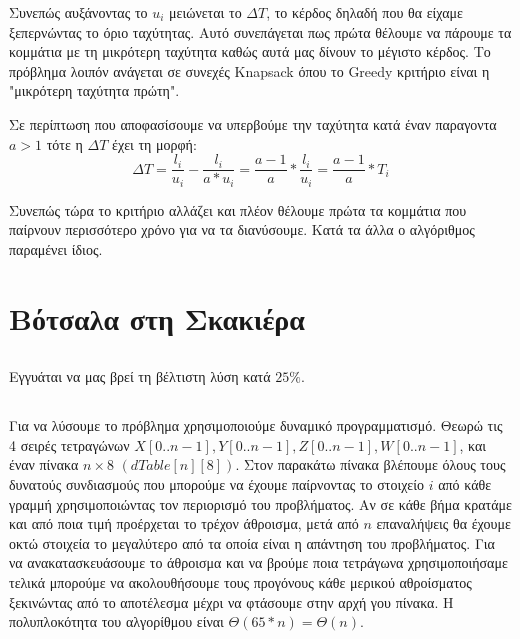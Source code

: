 \documentclass[a4paper,10pt]{article} \usepackage{anysize}
\begin{document}
Συνεπώς αυξάνοντας το $u_i$ μειώνεται το $\Delta{T}$, το κέρδος δηλαδή που θα
είχαμε ξεπερνώντας το όριο ταχύτητας. Αυτό συνεπάγεται πως πρώτα θέλουμε να
πάρουμε τα κομμάτια με τη μικρότερη ταχύτητα καθώς αυτά μας δίνουν το μέγιστο
κέρδος. Το πρόβλημα λοιπόν ανάγεται σε συνεχές Knapsack όπου το Greedy
κριτήριο είναι η "μικρότερη ταχύτητα πρώτη".

Σε περίπτωση που αποφασίσουμε να υπερβούμε την ταχύτητα κατά έναν παραγοντα
$a>1$ τότε η $\Delta{T}$ έχει τη μορφή:
\[
	\Delta{T}=\frac{l_i}{u_i} - \frac{l_i}{a*u_i} =
	\frac{a-1}{a}*\frac{l_i}{u_i} = \frac{a-1}{a}*T_i
\] 

Συνεπώς τώρα το κριτήριο αλλάζει και πλέον θέλουμε πρώτα τα κομμάτια που
παίρνουν περισσότερο χρόνο για να τα διανύσουμε. Κατά τα άλλα ο αλγόριθμος
παραμένει ίδιος.


\section{Βότσαλα στη Σκακιέρα}
\subsection{} Εγγυάται να μας βρεί τη βέλτιστη λύση κατά $25\%$.
\subsection{} Για να λύσουμε το πρόβλημα χρησιμοποιούμε δυναμικό προγραμματισμό. Θεωρώ τις 4 σειρές
τετραγώνων $X[0..n-1],Y[0..n-1],Z[0..n-1],W[0..n-1]$, και έναν πίνακα
$n\times8$ $(dTable[n][8])$. Στον παρακάτω πίνακα βλέπουμε
όλους τους δυνατούς συνδιασμούς που μπορούμε να έχουμε παίρνοντας το στοιχείο
$i$ από κάθε γραμμή χρησιμοποιώντας τον περιορισμό του προβλήματος. Αν σε κάθε
βήμα κρατάμε και από ποια τιμή προέρχεται το τρέχον άθροισμα, μετά από $n$
επαναλήψεις θα έχουμε οκτώ στοιχεία το μεγαλύτερο από τα οποία είναι η
απάντηση του προβλήματος. Για να ανακατασκευάσουμε το άθροισμα και να βρούμε
ποια τετράγωνα χρησιμοποιήσαμε τελικά μπορούμε να ακολουθήσουμε τους προγόνους
κάθε μερικού αθροίσματος ξεκινώντας από το αποτέλεσμα μέχρι να φτάσουμε στην
αρχή γου πίνακα. Η πολυπλοκότητα του αλγορίθμου είναι
$\Theta{(65*n)}=\Theta{(n)}$.
\end{document}
